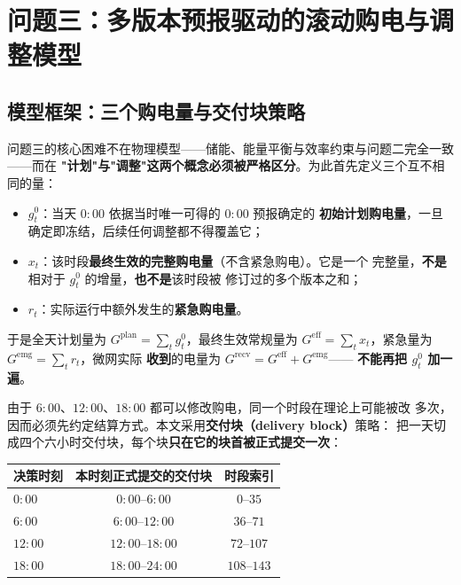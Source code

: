 
\section{问题三：多版本预报驱动的滚动购电与调整模型}

\subsection{模型框架：三个购电量与交付块策略}

问题三的核心困难不在物理模型——储能、能量平衡与效率约束与问题二完全一致——而在
\textbf{"计划"与"调整"这两个概念必须被严格区分}。为此首先定义三个互不相同的量：

\begin{itemize}
  \item $g_t^0$：当天 $0{:}00$ 依据当时唯一可得的 $0{:}00$ 预报确定的
        \textbf{初始计划购电量}，一旦确定即冻结，后续任何调整都不得覆盖它；
  \item $x_t$：该时段\textbf{最终生效的完整购电量}（不含紧急购电）。它是一个
        完整量，\textbf{不是}相对于 $g_t^0$ 的增量，\textbf{也不是}该时段被
        修订过的多个版本之和；
  \item $r_t$：实际运行中额外发生的\textbf{紧急购电量}。
\end{itemize}

于是全天计划量为 $G^{\mathrm{plan}}=\sum_tg_t^0$，最终生效常规量为
$G^{\mathrm{eff}}=\sum_tx_t$，紧急量为 $G^{\mathrm{emg}}=\sum_tr_t$，微网实际
\textbf{收到}的电量为 $G^{\mathrm{recv}}=G^{\mathrm{eff}}+G^{\mathrm{emg}}$——
\textbf{不能再把 $g_t^0$ 加一遍}。

由于 $6{:}00$、$12{:}00$、$18{:}00$ 都可以修改购电，同一个时段在理论上可能被改
多次，因而必须先约定结算方式。本文采用\textbf{交付块（delivery block）}策略：
把一天切成四个六小时交付块，每个块\textbf{只在它的块首被正式提交一次}：

\begin{center}
\footnotesize
\begin{tabular}{lcc}
  \toprule
  决策时刻 & 本时刻正式提交的交付块 & 时段索引 \\
  \midrule
  $0{:}00$  & $0{:}00$--$6{:}00$   & $0$--$35$ \\
  $6{:}00$  & $6{:}00$--$12{:}00$  & $36$--$71$ \\
  $12{:}00$ & $12{:}00$--$18{:}00$ & $72$--$107$ \\
  $18{:}00$ & $18{:}00$--$24{:}00$ & $108$--$143$ \\
  \bottomrule
\end{tabular}
\end{center}

